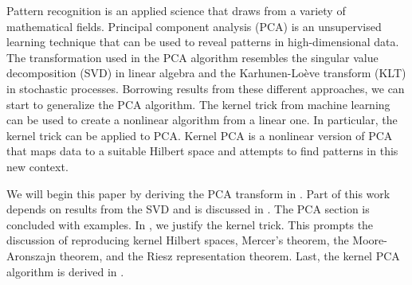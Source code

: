 % 

Pattern recognition is an applied science that draws from a variety of mathematical fields.
Principal component analysis (PCA) is an unsupervised learning technique that can be used to reveal patterns in high-dimensional data.
The transformation used in the PCA algorithm resembles the singular value decomposition (SVD) in linear algebra and the Karhunen-Loève transform (KLT) in stochastic processes.
Borrowing results from these different approaches, we can start to generalize the PCA algorithm.
The kernel trick from machine learning can be used to create a nonlinear algorithm from a linear one.
In particular, the kernel trick can be applied to PCA.
Kernel PCA is a nonlinear version of PCA that maps data to a suitable Hilbert space and attempts to find patterns in this new context.

We will begin this paper by deriving the PCA transform in .
Part of this work depends on results from the SVD and is discussed in .
The PCA section is concluded with examples.
In , we justify the kernel trick.
This prompts the discussion of reproducing kernel Hilbert spaces, Mercer's theorem, the Moore-Aronszajn theorem, and the Riesz representation theorem.
Last, the kernel PCA algorithm is derived in .

% 

%     
